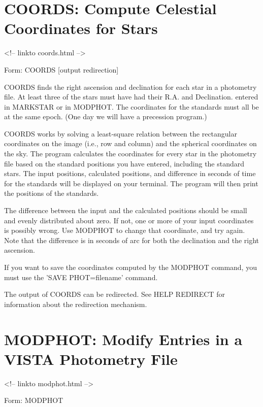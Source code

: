 \section{COORDS: Compute Celestial Coordinates for Stars}
\begin{rawhtml}
<!-- linkto coords.html -->
\end{rawhtml}
\begin{command}
  \item[Form: COORDS {[output redirection]}\hfill]{}
\end{command}

COORDS finds the right ascension and declination for each star in a
photometry file.  At least three of the stars must have had their R.A. and
Declination. entered in MARKSTAR or in MODPHOT.  The coordinates for the
standards must all be at the same epoch. (One day we will have a precession
program.)

COORDS works by solving a least-square relation between the rectangular
coordinates on the image (i.e., row and column) and the spherical
coordinates on the sky. The program calculates the coordinates for every
star in the photometry file based on the standard positions you have
entered, including the standard stars. The input positions, calculated
positions, and difference in seconds of time for the standards will be
displayed on your terminal. The program will then print the positions of
the standards.

The difference between the input and the calculated positions should be
small and evenly distributed about zero. If not, one or more of your input
coordinates is possibly wrong.  Use MODPHOT to change that coordinate, and
try again.  Note that the difference is in seconds of arc for both the
declination and the right ascension.

If you want to save the coordinates computed by the MODPHOT command, you
must use the 'SAVE PHOT=filename' command.

The output of COORDS can be redirected.  See HELP REDIRECT for information
about the redirection mechanism.

\section{MODPHOT: Modify Entries in a VISTA Photometry File}
\begin{rawhtml}
<!-- linkto modphot.html -->
\end{rawhtml}
\begin{command}
  \item[Form: MODPHOT\hfill]{}
\end{command}

